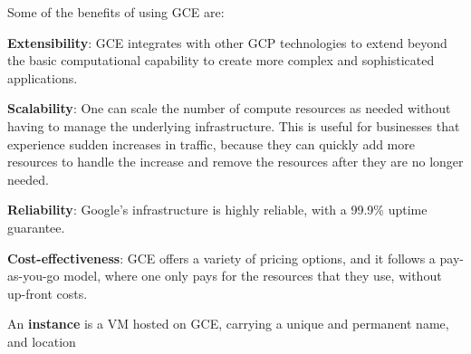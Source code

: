 Some of the benefits of using GCE are:
\bit
\item \textbf{Extensibility}: GCE integrates with other GCP technologies to extend beyond the basic computational
capability to create more complex and sophisticated applications.
\item \textbf{Scalability}: One can scale the number of compute resources as needed without having to manage the
underlying infrastructure. This is useful for businesses that experience sudden increases in traffic, because they can
quickly add more resources to handle the increase and remove the resources after they are no longer needed.
\item \textbf{Reliability}: Google's infrastructure is highly reliable, with a 99.9\% uptime guarantee.
\item \textbf{Cost-effectiveness}: GCE offers a variety of pricing options, and it follows a pay-as-you-go model, where
one only pays for the resources that they use, without up-front costs.
\eit

\bd[Instance]
An \textbf{instance} is a VM hosted on GCE\@, carrying a unique and permanent name, and location
\ed

